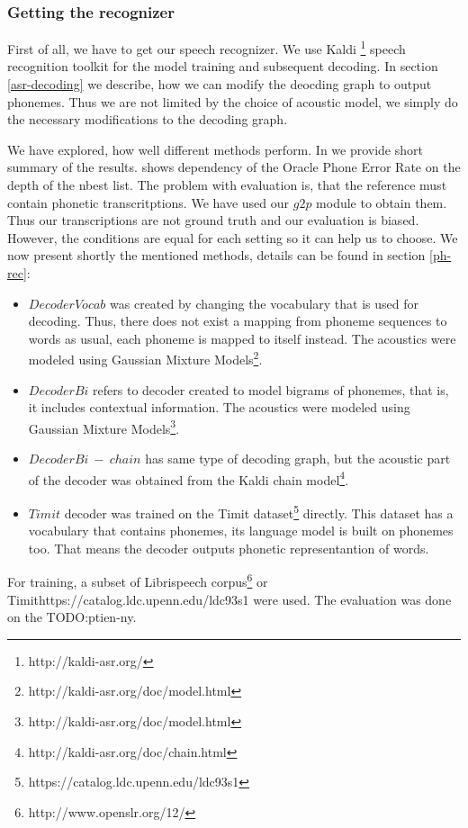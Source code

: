 \subsubsection{Getting the recognizer}
\label{recoexp}
First of all, we have to get our speech recognizer.
We use Kaldi \footnote{http://kaldi-asr.org/} speech recognition toolkit for the model training and subsequent decoding.
In section \ref{asr-decoding} we describe, how we can modify the deocding graph to output phonemes.
Thus we are not limited by the choice of acoustic model, we simply do the necessary modifications to the decoding graph.
\par
We have explored, how well different methods perform.
In  we provide short summary of the results.
 shows dependency of the Oracle Phone Error Rate on the depth of the nbest list.
The problem with evaluation is, that the reference must contain phonetic transcritptions.
We have used our $g2p$ module to obtain them.
Thus our transcriptions are not ground truth and our evaluation is biased.
However, the conditions are equal for each setting so it can help us to choose.
We now present shortly the mentioned methods, details can be found in section \ref{ph-rec}:
\begin{itemize}
\item $DecoderVocab$ was created by changing the vocabulary that is used for decoding. Thus, there does not exist a mapping from phoneme sequences to words as usual, each phoneme is mapped to itself instead. The acoustics were modeled using Gaussian Mixture Models\footnote{http://kaldi-asr.org/doc/model.html}.
\item $DecoderBi$ refers to decoder created to model bigrams of phonemes, that is, it includes contextual information. The acoustics were modeled using Gaussian Mixture Models\footnote{http://kaldi-asr.org/doc/model.html}.
\item $DecoderBi\:-\:chain$ has same type of decoding graph, but the acoustic part of the decoder was obtained from the Kaldi chain model\footnote{http://kaldi-asr.org/doc/chain.html}.
\item $Timit$ decoder was trained on the Timit dataset\footnote{https://catalog.ldc.upenn.edu/ldc93s1} directly. This dataset has a vocabulary that contains phonemes, its language model is built on phonemes too.
That means the decoder outputs phonetic representantion of words.
\end{itemize}
For training, a subset of Librispeech corpus\footnote{http://www.openslr.org/12/} or Timit{https://catalog.ldc.upenn.edu/ldc93s1} were used. The evaluation was done on the TODO:ptien-ny.
